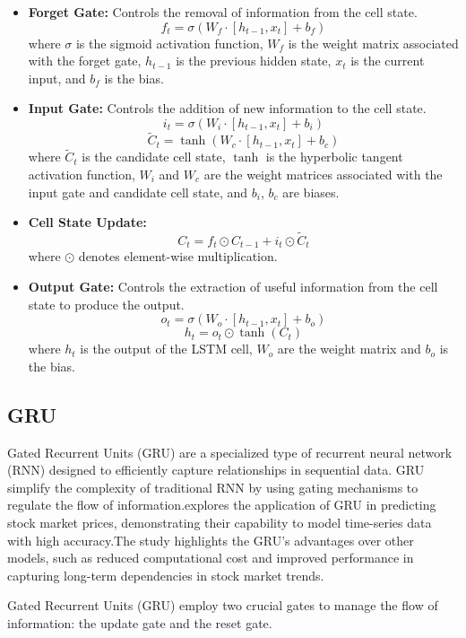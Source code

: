 \documentclass{ieeeojies}
\begin{document}
\begin{itemize}
    \item \textbf{Forget Gate:} Controls the removal of information from the cell state.
    \[
    f_t = \sigma(W_f \cdot [h_{t-1}, x_t] + b_f)
    \]
    where \( \sigma \) is the sigmoid activation function, \( W_f \) is the weight matrix associated with the forget gate, \( h_{t-1} \) is the previous hidden state, \( x_t \) is the current input, and \( b_f \) is the bias.
    
    \item \textbf{Input Gate:} Controls the addition of new information to the cell state.
    \[
    i_t = \sigma(W_i \cdot [h_{t-1}, x_t] + b_i)
    \]
    \[
    \widetilde{C}_t = \tanh(W_c \cdot [h_{t-1}, x_t] + b_c)
    \]
    where \( \widetilde{C}_t \) is the candidate cell state, \( \tanh \) is the hyperbolic tangent activation function, \( W_i \) and \( W_c \) are the weight matrices associated with the input gate and candidate cell state, and \( b_i \), \( b_c \) are biases.
    
    \item \textbf{Cell State Update:}
    \[
    C_t = f_t \odot C_{t-1} + i_t \odot \widetilde{C}_t
    \]
    where \( \odot \) denotes element-wise multiplication.
    
    \item \textbf{Output Gate:} Controls the extraction of useful information from the cell state to produce the output.
    \[
    o_t = \sigma(W_o \cdot [h_{t-1}, x_t] + b_o)
    \]
    \[
    h_t = o_t \odot \tanh(C_t)
    \]
    where \( h_t \) is the output of the LSTM cell, \( W_o \) are the weight matrix and \( b_o \) is the bias.
\end{itemize}
\subsection{GRU}
Gated Recurrent Units (GRU) are a specialized type of recurrent neural network (RNN) designed to efficiently capture relationships in sequential data. GRU simplify the complexity of traditional RNN by using gating mechanisms to regulate the flow of information.explores the application of GRU in predicting stock market prices, demonstrating their capability to model time-series data with high accuracy.The study highlights the GRU's advantages over other models, such as reduced computational cost and improved performance in capturing long-term dependencies in stock market trends.

Gated Recurrent Units (GRU) employ two crucial gates to manage the flow of information: the update gate and the reset gate.
\end{document}

